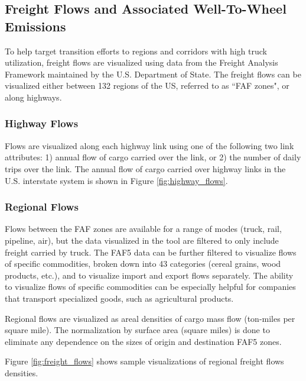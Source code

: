\subsection{Freight Flows and Associated Well-To-Wheel Emissions}

To help target transition efforts to regions and corridors with high truck utilization, freight flows are visualized using data from the Freight Analysis Framework \cite{faf5_2024} maintained by the U.S. Department of State. The freight flows can be visualized either between 132 regions of the US, referred to as ``FAF zones", or along highways. 

\subsubsection{Highway Flows}
Flows are visualized along each highway link using one of the following two link attributes: 1) annual flow of cargo carried over the link, or 2) the number of daily trips over the link. The annual flow of cargo carried over highway links in the U.S. interstate system is shown in Figure \ref{fig:highway_flows}.

\subsubsection{Regional Flows}
Flows between the FAF zones are available for a range of modes (truck, rail, pipeline, air), but the data visualized in the tool are filtered to only include freight carried by truck. The FAF5 data can be further filtered to visualize flows of specific commodities, broken down into 43 categories (cereal grains, wood products, etc.), and to visualize import and export flows separately. The ability to visualize flows of specific commodities can be especially helpful for companies that transport specialized goods, such as agricultural products. 

Regional flows are visualized as areal densities of cargo mass flow (ton-miles per square mile). The normalization by surface area (square miles) is done to eliminate any dependence on the sizes of origin and destination FAF5 zones. 

Figure \ref{fig:freight_flows} shows sample visualizations of regional freight flows densities. 


